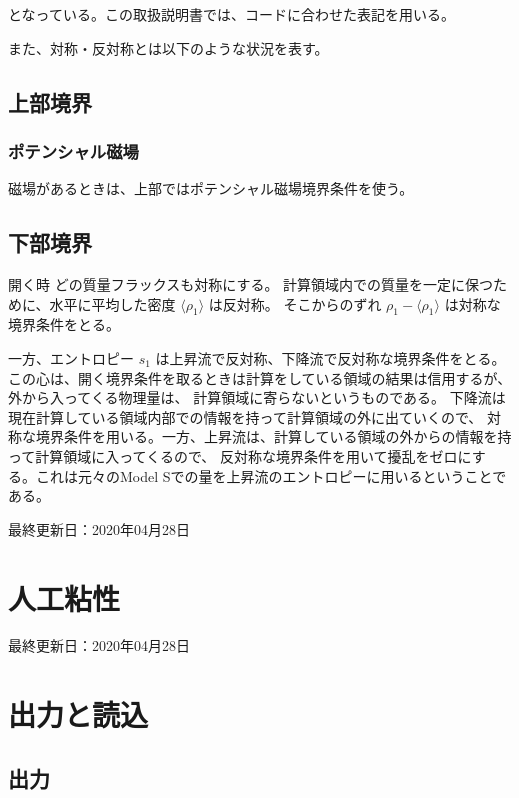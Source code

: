 \documentclass[letterpaper,10pt,dvipdfmx,report]{sphinxmanual}
\let\sphinxpxdimen\pdfpxdimen\else\newdimen\sphinxpxdimen
\begin{document}
となっている。この取扱説明書では、コードに合わせた表記を用いる。

また、対称・反対称とは以下のような状況を表す。

\noindent\sphinxincludegraphics[width=450\sphinxpxdimen]{{bc_sym}.png}


\section{上部境界}
\label{\detokenize{boundary:id2}}

\subsection{ポテンシャル磁場}
\label{\detokenize{boundary:id3}}
磁場があるときは、上部ではポテンシャル磁場境界条件を使う。


\section{下部境界}
\label{\detokenize{boundary:id4}}
開く時
どの質量フラックスも対称にする。 計算領域内での質量を一定に保つために、水平に平均した密度
\(\langle \rho_1\rangle\) は反対称。 そこからのずれ
\(\rho_1 - \langle \rho_1 \rangle\) は対称な境界条件をとる。

一方、エントロピー \(s_1\) は上昇流で反対称、下降流で反対称な境界条件をとる。
この心は、開く境界条件を取るときは計算をしている領域の結果は信用するが、外から入ってくる物理量は、
計算領域に寄らないというものである。 下降流は現在計算している領域内部での情報を持って計算領域の外に出ていくので、
対称な境界条件を用いる。一方、上昇流は、計算している領域の外からの情報を持って計算領域に入ってくるので、
反対称な境界条件を用いて擾乱をゼロにする。これは元々のModel Sでの量を上昇流のエントロピーに用いるということである。

最終更新日：2020年04月28日


\chapter{人工粘性}
\label{\detokenize{artdif:id1}}\label{\detokenize{artdif::doc}}
最終更新日：2020年04月28日


\chapter{出力と読込}
\label{\detokenize{io:id1}}\label{\detokenize{io::doc}}

\section{出力}
\label{\detokenize{io:id2}}
\end{document}
